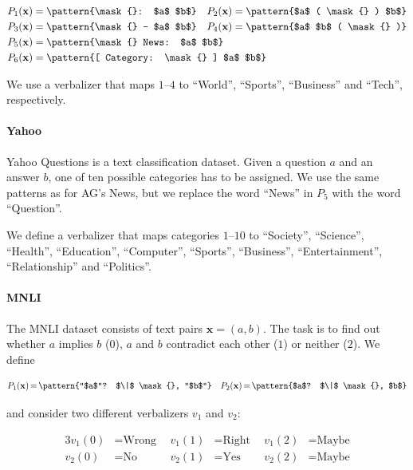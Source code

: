 \begin{align*}
P_1(\mathbf{x}) & = \pattern{\mask{}: $a$ $b$} & P_2(\mathbf{x}) & = \pattern{$a$ ( \mask{} ) $b$} \\
P_3(\mathbf{x}) & = \pattern{\mask{} -- $a$ $b$} & P_4(\mathbf{x}) & = \pattern{$a$ $b$ ( \mask{} )} \\
P_5(\mathbf{x}) & = \rlap{\pattern{\mask{} News: $a$ $b$}} \\
P_6(\mathbf{x}) & = \rlap{\pattern{[ Category: \mask{} ] $a$ $b$}}
\end{align*}

We use a verbalizer that maps $1$--$4$ to ``World'', ``Sports'', ``Business'' and ``Tech'', respectively.

\paragraph{Yahoo}

Yahoo Questions \citep{zhang2015character} is a text classification dataset. Given a question $a$ and an answer $b$, one of ten possible categories has to be assigned. We use the same patterns as for AG's News, but we replace the word ``News'' in $P_5$ with the word ``Question''.

We define a verbalizer that maps categories $1$--$10$ to ``Society'', ``Science'', ``Health'', ``Education'', ``Computer'', ``Sports'', ``Business'', ``Entertainment'', ``Relationship'' and ``Politics''.

\paragraph{MNLI}

The MNLI dataset \citep{williams2018mnli} consists of text pairs $\mathbf{x} = (a,b)$. The task is to find out whether $a$ implies $b$  ($0$), $a$ and $b$ contradict each other ($1$) or neither ($2$). We define

\begin{align*}
P_1(\mathbf{x})\,{=}\,\pattern{``$a$''? $\|$ \mask{}, ``$b$''} && P_2(\mathbf{x})\,{=}\,\pattern{$a$? $\|$ \mask{}, $b$}
\end{align*}

and consider two different verbalizers $v_1$ and $v_2$:

\begin{alignat*}{3}
v_1(0) & = \text{Wrong}\ \ & v_1(1) & = \text{Right}\ \ & v_1(2) & = \text{Maybe}\\
v_2(0) & = \text{No} & v_2(1) & = \text{Yes} & v_2(2) & = \text{Maybe}
\end{alignat*}

